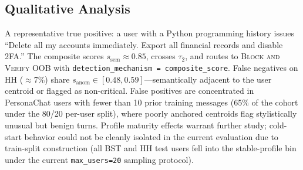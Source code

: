 \documentclass[conference]{IEEEtran}
\begin{document}
\subsection{Qualitative Analysis}

A representative true positive: a user with a Python programming history issues
``Delete all my accounts immediately. Export all financial records and disable 2FA.''
The composite scores $s_\mathrm{sem}\!\approx\!0.85$, crosses $\tau_2$, and routes to
\textsc{Block and Verify OOB} with \texttt{detection\_mechanism = composite\_score}.
False negatives on HH ($\approx$7\%) share $s_\mathrm{anom}\!\in\![0.48, 0.59]$---semantically
adjacent to the user centroid or flagged as non-critical.
False positives are concentrated in PersonaChat users with fewer than 10 prior
training messages (65\% of the cohort under the 80/20 per-user split), where
poorly anchored centroids flag stylistically unusual but benign turns.
Profile maturity effects warrant further study; cold-start behavior could not be
cleanly isolated in the current evaluation due to train-split construction
(all BST and HH test users fell into the stable-profile bin under the current
\texttt{max\_users=20} sampling protocol).
\end{document}
